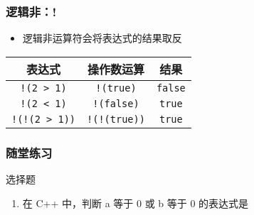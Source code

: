\begin{frame}[fragile]
    \frametitle{逻辑非：!}

    \begin{itemize}
        \item 逻辑非运算符会将表达式的结果取反
    \end{itemize}

    \begin{table}[]
        \begin{tabular}{ccc}
            \toprule
            表达式                  & 操作数运算             & 结果              \\
            \midrule
            \lstinline|!(2 > 1)|    & \lstinline|!(true)|    & \lstinline|false| \\
            \lstinline|!(2 < 1)|    & \lstinline|!(false)|   & \lstinline|true|  \\
            \lstinline|!(!(2 > 1))| & \lstinline|!(!(true))| & \lstinline|true|  \\
            \bottomrule
        \end{tabular}
    \end{table}
\end{frame}

\begin{frame}[fragile]
    \frametitle{随堂练习}

    \begin{exampleblock}{选择题}

        \begin{enumerate}
            \item 在 C++ 中，判断 a 等于 0 或 b 等于 0 的表达式是


        \end{enumerate}

    \end{exampleblock}
\end{frame}

